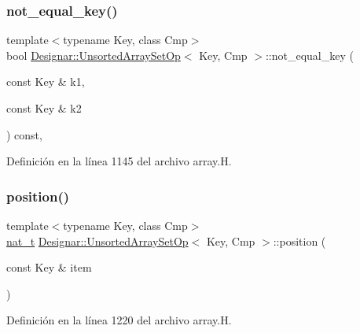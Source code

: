 \subsubsection{\texorpdfstring{not\+\_\+equal\+\_\+key()}{not\_equal\_key()}}
{\footnotesize\ttfamily template$<$typename Key, class Cmp$>$ \\
bool \hyperlink{class_designar_1_1_unsorted_array_set_op}{Designar\+::\+Unsorted\+Array\+Set\+Op}$<$ Key, Cmp $>$\+::not\+\_\+equal\+\_\+key (\begin{DoxyParamCaption}\item[{const Key \&}]{k1,  }\item[{const Key \&}]{k2 }\end{DoxyParamCaption}) const\hspace{0.3cm}{\ttfamily [inline]}, {\ttfamily [protected]}}



Definición en la línea 1145 del archivo array.\+H.

\mbox{\label{class_designar_1_1_unsorted_array_set_op_ab2f0ef08a3d92669f793727d51de705e}} 
\subsubsection{\texorpdfstring{position()}{position()}}
{\footnotesize\ttfamily template$<$typename Key, class Cmp$>$ \\
\hyperlink{namespace_designar_aa72662848b9f4815e7bf31a7cf3e33d1}{nat\+\_\+t} \hyperlink{class_designar_1_1_unsorted_array_set_op}{Designar\+::\+Unsorted\+Array\+Set\+Op}$<$ Key, Cmp $>$\+::position (\begin{DoxyParamCaption}\item[{const Key \&}]{item }\end{DoxyParamCaption})\hspace{0.3cm}{\ttfamily [inline]}}



Definición en la línea 1220 del archivo array.\+H.

\mbox{\label{class_designar_1_1_unsorted_array_set_op_aced2517a0e708effb820f5591369a7c1}} 
